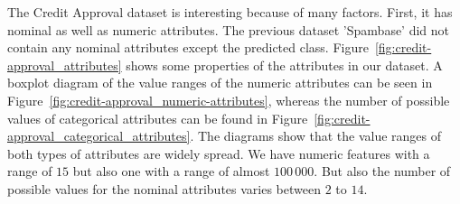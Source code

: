 \documentclass[a4paper,11pt]{article}
\begin{document}
    The Credit Approval dataset is interesting because of many factors. First, it has nominal as well as numeric attributes. The previous dataset 'Spambase' did not contain any nominal attributes except the predicted class. Figure~\ref{fig:credit-approval_attributes} shows some properties of the attributes in our dataset. A boxplot diagram of the value ranges of the numeric attributes can be seen in Figure~\ref{fig:credit-approval_numeric-attributes}, whereas the number of possible values of categorical attributes can be found in Figure~\ref{fig:credit-approval_categorical_attributes}. The diagrams show that the value ranges of both types of attributes are widely spread. We have numeric features with a range of $15$ but also one with a range of almost $100\,000$. But also the number of possible values for the nominal attributes varies between $2$ to $14$. 
    
\end{document}
